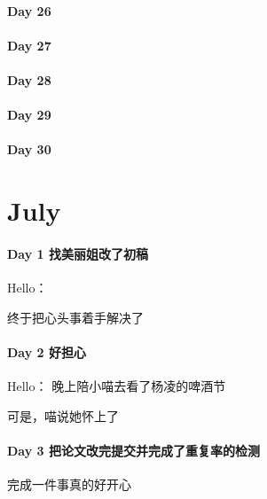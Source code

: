 \documentclass[UTF8,a4paper,8pt]{ctexart}
\begin{document}
 	 \paragraph{Day 26      \quad     }
 	 \paragraph{Day 27      \quad     }
 	 \paragraph{Day 28      \quad     }
 	 \paragraph{Day 29      \quad     }   
 	 \paragraph{Day 30      \quad     }
 	 
 \section{July}
 	 \paragraph{Day 1    找美丽姐改了初稿   \quad     }
	 	  Hello：
	 	  
		 	  终于把心头事着手解决了
 	 \paragraph{Day 2    好担心  \quad     }
	 	 Hello：
		 	 晚上陪小喵去看了杨凌的啤酒节
		 	 
			 可是，喵说她怀上了
	 	 
 	 \paragraph{Day 3    把论文改完提交并完成了重复率的检测    \quad     }
		 	 完成一件事真的好开心
		 	 
\end{document}
